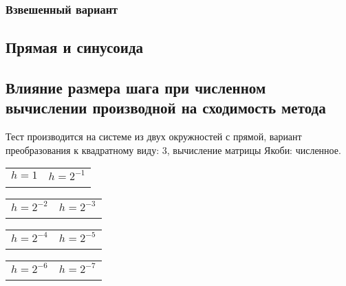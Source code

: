 \subsubsection{Взвешенный вариант}
\subsection{Прямая и синусоида}

\subsection{Влияние размера шага при численном вычислении производной на сходимость метода}

Тест производится на системе из двух окружностей с прямой, вариант преобразования к квадратному виду: 3, вычисление матрицы Якоби: численное.

\noindent\begin{tabu}{X[c]X[c]}
\hline
$h = 1$ & $h = 2^{-1}$ \\
 &
 \\
\end{tabu}

\vspace{3mm}

\noindent\begin{tabu}{X[c]X[c]}
\hline
$h = 2^{-2}$ & $h = 2^{-3}$ \\
 &
 \\
\end{tabu}

\vspace{3mm}

\noindent\begin{tabu}{X[c]X[c]}
\hline
$h = 2^{-4}$ & $h = 2^{-5}$ \\
 &
 \\
\end{tabu}

\vspace{3mm}

\noindent\begin{tabu}{X[c]X[c]}
\hline
$h = 2^{-6}$ & $h = 2^{-7}$ \\
 &
 \\
\end{tabu}

